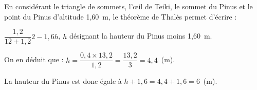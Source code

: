 
\medskip

%
%
%
% 
%
%
En considérant le triangle de sommets, l'œil de Teiki, le sommet du Pinus et le point du Pinus d'altitude 1,60~m, le théorème de Thalès permet d'écrire :

$\dfrac{1,2}{12+1,2}{2 - 1,6}{h}$, $h$ désignant la hauteur du Pinus moins 1,60~m.

On en déduit que : $h = \dfrac{0,4 \times 13,2}{1,2} = \dfrac{13,2}{3} = 4,4$~(m).

La hauteur du Pinus est donc égale à $h + 1,6 = 4,4 + 1,6 = 6$~(m).

\bigskip

